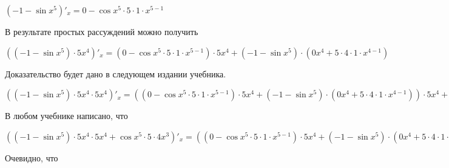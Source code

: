 \documentclass[12pt,a4paper,fleqn]{article}
\theoremstyle{definition}
\begin{document}
$( -1  - \sin{ x }^{ 5 })'_{x} =  0  - \cos{ x }^{ 5 } \cdot  5  \cdot  1  \cdot { x }^{ 5  -  1 }$

В результате простых рассуждений можно получить 

$(( -1  - \sin{ x }^{ 5 }) \cdot  5 { x }^{ 4 })'_{x} = ( 0  - \cos{ x }^{ 5 } \cdot  5  \cdot  1  \cdot { x }^{ 5  -  1 }) \cdot  5 { x }^{ 4 } + ( -1  - \sin{ x }^{ 5 }) \cdot ( 0 { x }^{ 4 } +  5  \cdot  4  \cdot  1  \cdot { x }^{ 4  -  1 })$

Доказательство будет дано в следующем издании учебника. 

$(( -1  - \sin{ x }^{ 5 }) \cdot  5 { x }^{ 4 } \cdot  5 { x }^{ 4 })'_{x} = (( 0  - \cos{ x }^{ 5 } \cdot  5  \cdot  1  \cdot { x }^{ 5  -  1 }) \cdot  5 { x }^{ 4 } + ( -1  - \sin{ x }^{ 5 }) \cdot ( 0 { x }^{ 4 } +  5  \cdot  4  \cdot  1  \cdot { x }^{ 4  -  1 })) \cdot  5 { x }^{ 4 } + ( -1  - \sin{ x }^{ 5 }) \cdot  5 { x }^{ 4 } \cdot ( 0 { x }^{ 4 } +  5  \cdot  4  \cdot  1  \cdot { x }^{ 4  -  1 })$

В любом учебнике написано, что 

$(( -1  - \sin{ x }^{ 5 }) \cdot  5 { x }^{ 4 } \cdot  5 { x }^{ 4 } + \cos{ x }^{ 5 } \cdot  5  \cdot  4 { x }^{ 3 })'_{x} = (( 0  - \cos{ x }^{ 5 } \cdot  5  \cdot  1  \cdot { x }^{ 5  -  1 }) \cdot  5 { x }^{ 4 } + ( -1  - \sin{ x }^{ 5 }) \cdot ( 0 { x }^{ 4 } +  5  \cdot  4  \cdot  1  \cdot { x }^{ 4  -  1 })) \cdot  5 { x }^{ 4 } + ( -1  - \sin{ x }^{ 5 }) \cdot  5 { x }^{ 4 } \cdot ( 0 { x }^{ 4 } +  5  \cdot  4  \cdot  1  \cdot { x }^{ 4  -  1 }) + ( -1  - \sin{ x }^{ 5 }) \cdot  5  \cdot  1  \cdot { x }^{ 5  -  1 } \cdot  5  \cdot  4 { x }^{ 3 } + \cos{ x }^{ 5 } \cdot ( 0  \cdot  4 { x }^{ 3 } +  5  \cdot ( 0 { x }^{ 3 } +  4  \cdot  3  \cdot  1  \cdot { x }^{ 3  -  1 }))$

Очевидно, что 
\end{document}
